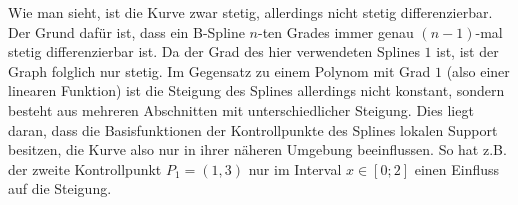 Wie man sieht, ist die Kurve zwar stetig, allerdings nicht stetig differenzierbar. Der Grund dafür ist, dass ein B-Spline $n$-ten Grades immer genau $(n-1)$-mal stetig differenzierbar ist. Da der Grad des hier verwendeten Splines $1$ ist, ist der Graph folglich nur stetig. Im Gegensatz zu einem Polynom mit Grad $1$ (also einer linearen Funktion) ist die Steigung des Splines allerdings nicht konstant, sondern besteht aus mehreren Abschnitten mit unterschiedlicher Steigung. Dies liegt daran, dass die Basisfunktionen der Kontrollpunkte des Splines lokalen Support besitzen, die Kurve also nur in ihrer näheren Umgebung beeinflussen. So hat z.B. der zweite Kontrollpunkt $P_1 = (1, 3)$ nur im Interval $x\in [0;2]$ einen Einfluss auf die Steigung.